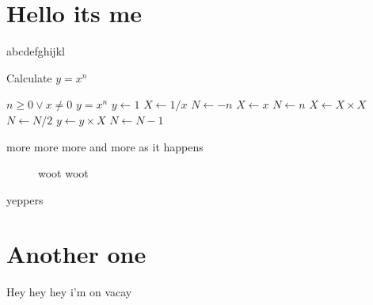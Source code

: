 \documentclass{article}
\author{Hello its me}
\begin{document}
\section{Hello its me}
abcdefghijkl

\begin{algorithm}[H]
    \caption{Calculate $y = x^n$}
    \label{alg1}
    \begin{algorithmic}
        \REQUIRE $n \geq 0 \vee x \neq 0$
        \ENSURE $y = x^n$
        \STATE $y \leftarrow 1$
        \STATE $X \leftarrow 1 / x$
        \STATE $N \leftarrow -n$
        \ELSE
        \STATE $X \leftarrow x$
        \STATE $N \leftarrow n$
        \ENDIF
        \STATE $X \leftarrow X \times X$
        \STATE $N \leftarrow N / 2$
        \ELSE[$N$ is odd]
        \STATE $y \leftarrow y \times X$
        \STATE $N \leftarrow N - 1$
        \ENDIF
        \ENDWHILE
    \end{algorithmic}
\end{algorithm}

more more more and more as it happens
\begin{figure}
    \caption{woot woot}
\end{figure}
yeppers
\section{Another one}
Hey hey hey i'm on vacay
\end{document}
